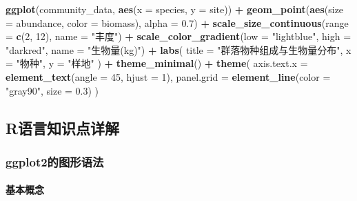 \documentclass[
  twoside]{book}
\newenvironment{Shaded}{\begin{snugshade}}{\end{snugshade}}
\newcommand{\AttributeTok}[1]{\textcolor[rgb]{0.13,0.29,0.53}{#1}}
\newcommand{\DecValTok}[1]{\textcolor[rgb]{0.00,0.00,0.81}{#1}}
\newcommand{\FloatTok}[1]{\textcolor[rgb]{0.00,0.00,0.81}{#1}}
\newcommand{\FunctionTok}[1]{\textcolor[rgb]{0.13,0.29,0.53}{\textbf{#1}}}
\newcommand{\NormalTok}[1]{#1}
\newcommand{\SpecialCharTok}[1]{\textcolor[rgb]{0.81,0.36,0.00}{\textbf{#1}}}
\newcommand{\StringTok}[1]{\textcolor[rgb]{0.31,0.60,0.02}{#1}}
\begin{document}
\begin{Shaded}
\begin{Highlighting}[]
\FunctionTok{ggplot}\NormalTok{(community\_data, }\FunctionTok{aes}\NormalTok{(}\AttributeTok{x =}\NormalTok{ species, }\AttributeTok{y =}\NormalTok{ site)) }\SpecialCharTok{+}
  \FunctionTok{geom\_point}\NormalTok{(}\FunctionTok{aes}\NormalTok{(}\AttributeTok{size =}\NormalTok{ abundance, }\AttributeTok{color =}\NormalTok{ biomass), }\AttributeTok{alpha =} \FloatTok{0.7}\NormalTok{) }\SpecialCharTok{+}
  \FunctionTok{scale\_size\_continuous}\NormalTok{(}\AttributeTok{range =} \FunctionTok{c}\NormalTok{(}\DecValTok{2}\NormalTok{, }\DecValTok{12}\NormalTok{), }\AttributeTok{name =} \StringTok{"丰度"}\NormalTok{) }\SpecialCharTok{+}
  \FunctionTok{scale\_color\_gradient}\NormalTok{(}\AttributeTok{low =} \StringTok{"lightblue"}\NormalTok{, }\AttributeTok{high =} \StringTok{"darkred"}\NormalTok{, }\AttributeTok{name =} \StringTok{"生物量(kg)"}\NormalTok{) }\SpecialCharTok{+}
  \FunctionTok{labs}\NormalTok{(}
    \AttributeTok{title =} \StringTok{"群落物种组成与生物量分布"}\NormalTok{,}
    \AttributeTok{x =} \StringTok{"物种"}\NormalTok{,}
    \AttributeTok{y =} \StringTok{"样地"}
\NormalTok{  ) }\SpecialCharTok{+}
  \FunctionTok{theme\_minimal}\NormalTok{() }\SpecialCharTok{+}
  \FunctionTok{theme}\NormalTok{(}
    \AttributeTok{axis.text.x =} \FunctionTok{element\_text}\NormalTok{(}\AttributeTok{angle =} \DecValTok{45}\NormalTok{, }\AttributeTok{hjust =} \DecValTok{1}\NormalTok{),}
    \AttributeTok{panel.grid =} \FunctionTok{element\_line}\NormalTok{(}\AttributeTok{color =} \StringTok{"gray90"}\NormalTok{, }\AttributeTok{size =} \FloatTok{0.3}\NormalTok{)}
\NormalTok{  )}
\end{Highlighting}
\end{Shaded}

\hypertarget{rux8bedux8a00ux77e5ux8bc6ux70b9ux8be6ux89e3-9}{%
\subsection{R语言知识点详解}\label{rux8bedux8a00ux77e5ux8bc6ux70b9ux8be6ux89e3-9}}

\hypertarget{ggplot2ux7684ux56feux5f62ux8bedux6cd5}{%
\subsubsection{ggplot2的图形语法}\label{ggplot2ux7684ux56feux5f62ux8bedux6cd5}}

\hypertarget{ux57faux672cux6982ux5ff5}{%
\paragraph{基本概念}\label{ux57faux672cux6982ux5ff5}}
\end{document}
